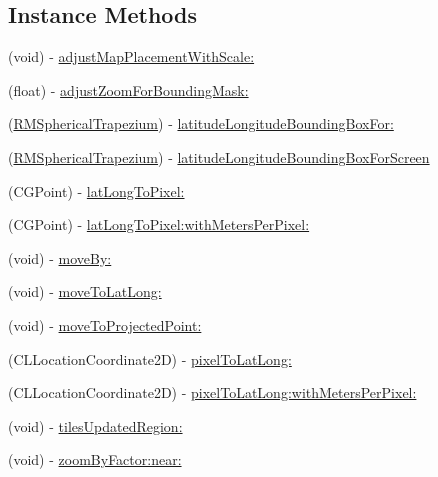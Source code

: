 \subsection*{Instance Methods}
\begin{DoxyCompactItemize}
\item 
(void) -\/ \hyperlink{protocol_r_m_map_contents_facade-p_a87677eea4a25861fe62cc2f8abb9842c}{adjust\-Map\-Placement\-With\-Scale\-:}
\item 
(float) -\/ \hyperlink{protocol_r_m_map_contents_facade-p_ac8f6ec5e5da36d4325cb4bda73a56b4a}{adjust\-Zoom\-For\-Bounding\-Mask\-:}
\item 
(\hyperlink{struct_r_m_spherical_trapezium}{R\-M\-Spherical\-Trapezium}) -\/ \hyperlink{protocol_r_m_map_contents_facade-p_a3472abc47e5dc6ebde858df2e168f9f1}{latitude\-Longitude\-Bounding\-Box\-For\-:}
\item 
(\hyperlink{struct_r_m_spherical_trapezium}{R\-M\-Spherical\-Trapezium}) -\/ \hyperlink{protocol_r_m_map_contents_facade-p_a45d3b80e0d26fdce5ec55edd29df8aed}{latitude\-Longitude\-Bounding\-Box\-For\-Screen}
\item 
(C\-G\-Point) -\/ \hyperlink{protocol_r_m_map_contents_facade-p_abe6c43a3535d4f793dd992f4e4202c74}{lat\-Long\-To\-Pixel\-:}
\item 
(C\-G\-Point) -\/ \hyperlink{protocol_r_m_map_contents_facade-p_a89f7b022d8955d82efa669f31eb9056a}{lat\-Long\-To\-Pixel\-:with\-Meters\-Per\-Pixel\-:}
\item 
(void) -\/ \hyperlink{protocol_r_m_map_contents_facade-p_a229f6bcfb540a9afb2f1620c2e79fcb2}{move\-By\-:}
\item 
(void) -\/ \hyperlink{protocol_r_m_map_contents_facade-p_afab5c65cfffa2209a44ed73962218589}{move\-To\-Lat\-Long\-:}
\item 
(void) -\/ \hyperlink{protocol_r_m_map_contents_facade-p_a2cdc6dc414cefda8f1616dd6572d5627}{move\-To\-Projected\-Point\-:}
\item 
(C\-L\-Location\-Coordinate2\-D) -\/ \hyperlink{protocol_r_m_map_contents_facade-p_a9e67a602bc0158b14610d0648640b856}{pixel\-To\-Lat\-Long\-:}
\item 
(C\-L\-Location\-Coordinate2\-D) -\/ \hyperlink{protocol_r_m_map_contents_facade-p_a6d1204e38b5879349d12f6fc57e93001}{pixel\-To\-Lat\-Long\-:with\-Meters\-Per\-Pixel\-:}
\item 
(void) -\/ \hyperlink{protocol_r_m_map_contents_facade-p_a862d9e91572a50e6ddb76a9985fdee05}{tiles\-Updated\-Region\-:}
\item 
(void) -\/ \hyperlink{protocol_r_m_map_contents_facade-p_af9a47536d397223358380cac31c960e1}{zoom\-By\-Factor\-:near\-:}

\end{DoxyCompactItemize}
